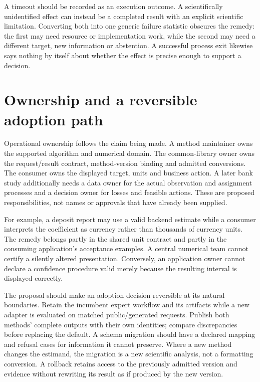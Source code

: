 A timeout should be recorded as an execution outcome. A scientifically
unidentified effect can instead be a completed result with an explicit
scientific limitation. Converting both into one generic failure statistic
obscures the remedy: the first may need resource or implementation work, while
the second may need a different target, new information or abstention. A
successful process exit likewise says nothing by itself about whether the
effect is precise enough to support a decision.

\section{Ownership and a reversible adoption path}

Operational ownership follows the claim being made. A method maintainer owns
the supported algorithm and numerical domain. The common-library owner owns
the request/result contract, method-version binding and admitted conversions.
The consumer owns the displayed target, units and business action. A later
bank study additionally needs a data owner for the actual observation and
assignment processes and a decision owner for losses and feasible actions.
These are proposed responsibilities, not names or approvals that have already
been supplied.

For example, a deposit report may use a valid backend estimate while a
consumer interprets the coefficient as currency rather than thousands of
currency units. The remedy belongs partly in the shared unit contract and
partly in the consuming application's acceptance examples. A central
numerical team cannot certify a silently altered presentation. Conversely,
an application owner cannot declare a confidence procedure valid merely
because the resulting interval is displayed correctly.

The proposal should make an adoption decision reversible at its natural
boundaries. Retain the incumbent expert workflow and its artifacts while a
new adapter is evaluated on matched public/generated requests. Publish both
methods' complete outputs with their own identities; compare discrepancies
before replacing the default. A schema migration should have a declared
mapping and refusal cases for information it cannot preserve. Where a new
method changes the estimand, the migration is a new scientific analysis,
not a formatting conversion. A rollback retains access to the previously
admitted version and evidence without rewriting its result as if produced
by the new version.

